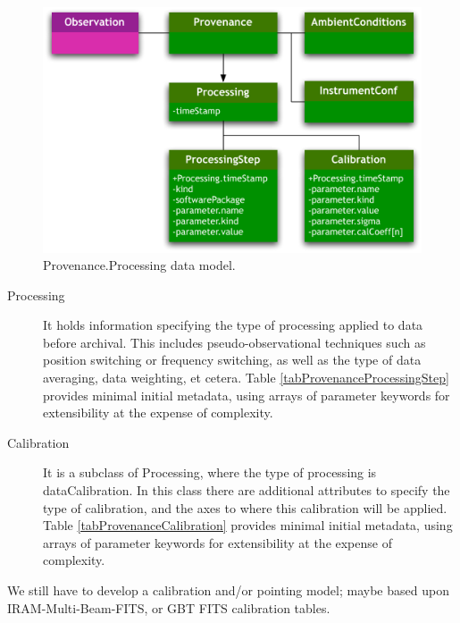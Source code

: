 		\begin{figure}[tbp]
		\begin{center}
		\includegraphics[width=0.6\columnwidth]{fig/Provenance-Processing-DM}
		\end{center}
		\caption[Provenance.Processing data model]
			{Provenance.Processing data model.}
		\label{figProvenanceProcessing}
		\end{figure}
		
		\begin{description}
			\item[Processing] It holds information specifying the
			type of processing applied to data before archival.
			This includes pseudo-observational techniques such as
			position switching or frequency switching, as well as
			the type of data averaging, data weighting, et cetera.
			Table \ref{tabProvenanceProcessingStep} provides
			minimal initial metadata, using arrays of parameter
			keywords for extensibility at the expense of
			complexity.
			
			 \item[Calibration] It is a subclass of Processing,
			where the type of processing is dataCalibration. In
			this class there are additional attributes to specify
			the type of calibration, and the axes to where this
			calibration will be applied. Table
			\ref{tabProvenanceCalibration} provides minimal initial
			metadata, using arrays of parameter keywords for
			extensibility at the expense of complexity.
		\end{description}
		
		 We still have to develop a calibration and/or pointing
		model; maybe based upon IRAM-Multi-Beam-FITS, or GBT FITS
		calibration tables.

